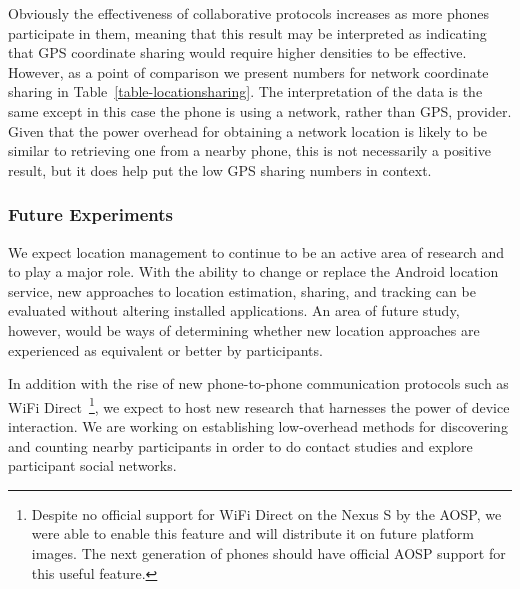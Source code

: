 Obviously the effectiveness of collaborative protocols increases as more
phones participate in them, meaning that this result may be interpreted as
indicating that GPS coordinate sharing would require higher densities to be
effective. However, as a point of comparison we present numbers for network
coordinate sharing in Table~\ref{table-locationsharing}. The interpretation
of the data is the same except in this case the phone is using a network,
rather than GPS, provider. Given that the power overhead for obtaining a
network location is likely to be similar to retrieving one from a nearby
phone, this is not necessarily a positive result, but it does help put the low
GPS sharing numbers in context.

\subsubsection{Future Experiments}

We expect location management to continue to be an active area of research
and \PhoneLab{} to play a major role. With the ability to change or replace
the Android location service, new approaches to location estimation, sharing,
and tracking can be evaluated without altering installed applications. An
area of future study, however, would be ways of determining whether new
location approaches are experienced as equivalent or better by \PhoneLab{}
participants.

In addition with the rise of new phone-to-phone communication protocols such
as WiFi Direct~\cite{wifi-direct}\footnote{Despite no official support for WiFi
Direct on the Nexus S by the AOSP, we were able to enable this feature and
will distribute it on future platform images. The next generation of
\PhoneLab{} phones should have official AOSP support for this useful
feature.}, we expect \PhoneLab{} to host new research that harnesses the
power of device interaction. We are working on establishing low-overhead
methods for discovering and counting nearby \PhoneLab{} participants in order
to do contact studies and explore participant social networks.
